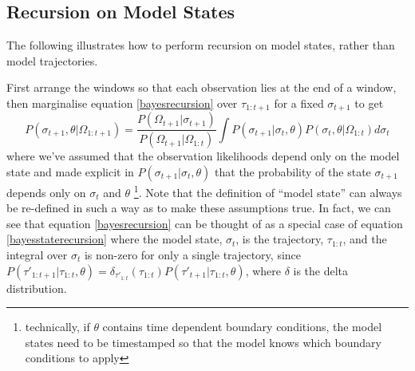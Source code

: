 \documentclass{article}
\begin{document}
%
%

\begin{appendices}

\section{Recursion on Model States}\label{appendix:state_recursion}

The following illustrates how to perform recursion on model states, rather than model trajectories.

First arrange the windows so that each observation lies at the end of a window, then marginalise equation \eqref{bayesrecursion} over $\tau_{1:t+1}$ for a fixed $\sigma_{t+1}$ to get
\begin{equation}
P\left(\sigma_{t+1}, \theta | \Omega_{1:t+1}\right)
=
\frac{ P(\Omega_{t+1}|\sigma_{t+1}) 
}
{	P(\Omega_{t+1}| \Omega_{1:t}) }
\int P(\sigma_{t+1}|\sigma_t,\theta)P\left(\sigma_{t},\theta| \Omega_{1:t}\right) d \sigma_t
\label{bayesstaterecursion}
\end{equation}
where we've assumed that the observation likelihoods depend only on the model state and made explicit in $P(\sigma_{t+1}|\sigma_t,\theta)$ that the probability of the state $\sigma_{t+1}$ depends only on $\sigma_t$ and $\theta$  \footnote{technically, if $\theta$ contains time dependent boundary conditions, the model states need to be timestamped so that the model knows which boundary conditions to apply}.   Note that the definition of ``model state'' can always be re-defined in such a way as to make these assumptions true. In fact, we can see that equation \eqref{bayesrecursion} can be thought of as a special case of equation \eqref{bayesstaterecursion} where the model state, $\sigma_t$, is the trajectory, $\tau_{1:t}$, and the integral over $\sigma_t$ is non-zero for only a single trajectory, since $P(\tau'_{1:t+1}|\tau_{1:t},\theta) = \delta_{\tau'_{1:t}}(\tau_{1:t})P(\tau'_{t+1}|\tau_{1:t},\theta)$, where $\delta$ is the delta distribution.


\end{appendices}
\end{document}
